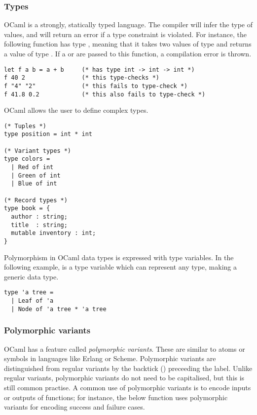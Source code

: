 \subsubsection{Types}

OCaml is a strongly, statically typed language. The compiler will
infer the type of values, and will return an error if a type
constraint is violated. For instance, the following function 
has type , meaning that it takes two values of
type  and returns a value of type . If a
 or  are passed to this function, a
compilation error is thrown.

\begin{lstlisting}
let f a b = a + b     (* has type int -> int -> int *)
f 40 2                (* this type-checks *)
f "4" "2"             (* this fails to type-check *)
f 41.8 0.2            (* this also fails to type-check *)
\end{lstlisting}

OCaml allows the user to define complex types.

\begin{lstlisting}
(* Tuples *)
type position = int * int

(* Variant types *)
type colors =
  | Red of int
  | Green of int
  | Blue of int

(* Record types *)
type book = {
  author : string;
  title  : string;
  mutable inventory : int;
}
\end{lstlisting}


Polymorphism in OCaml data types is expressed with type variables. In
the following example,  is a type variable which can
represent any type, making  a generic data type.

\begin{lstlisting}
type 'a tree =
  | Leaf of 'a
  | Node of 'a tree * 'a tree
\end{lstlisting}

\subsubsection{Polymorphic variants}

OCaml has a feature called \emph{polymorphic variants}. These are
similar to atoms or symbols in languages like Erlang or
Scheme. Polymorphic variants are distinguished from regular variants
by the backtick () preceeding the label. Unlike regular
variants, polymorphic variants do not need to be capitalised, but this
is still common practise. A common use of polymorphic variants is to
encode inputs or outputs of functions; for instance, the below
function uses polymorphic variants for encoding success and failure
cases.

